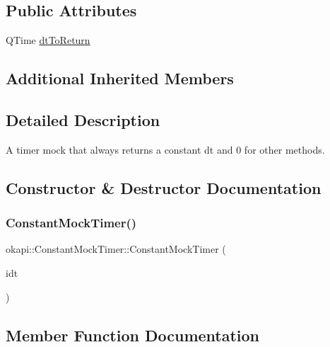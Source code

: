 \subsection*{Public Attributes}
\begin{DoxyCompactItemize}
\item 
Q\+Time \mbox{\hyperlink{classokapi_1_1ConstantMockTimer_a1a915222d11024eb55b5ce11fb6fd2be}{dt\+To\+Return}}
\end{DoxyCompactItemize}
\subsection*{Additional Inherited Members}


\subsection{Detailed Description}
A timer mock that always returns a constant dt and 0 for other methods. 

\subsection{Constructor \& Destructor Documentation}
\mbox{\label{classokapi_1_1ConstantMockTimer_a7ed0cb52e828ac06d890817538036317}} 
\subsubsection{\texorpdfstring{ConstantMockTimer()}{ConstantMockTimer()}}
{\footnotesize\ttfamily okapi\+::\+Constant\+Mock\+Timer\+::\+Constant\+Mock\+Timer (\begin{DoxyParamCaption}\item[{Q\+Time}]{idt }\end{DoxyParamCaption})\hspace{0.3cm}{\ttfamily [explicit]}}



\subsection{Member Function Documentation}
\mbox{\label{classokapi_1_1ConstantMockTimer_a021608c7b88e41faba5efcd44221fcc9}} 
